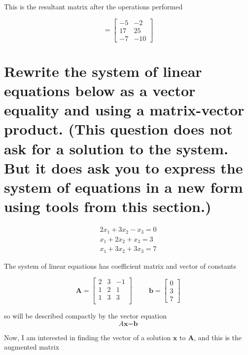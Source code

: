 \documentclass{article}
\begin{document}
This is the resultant matrix after the operations performed

\begin{equation}
  =
  \begin{bmatrix}
    -5 & -2 \\
    17 & 25 \\
    -7 & -10
  \end{bmatrix}
\end{equation}

\bigskip

\section{Rewrite the system of linear equations below as a vector equality and using a matrix-vector product. (This question does not ask for a solution to the system. But it does ask you to express the system of equations in a new form using tools from this section.)}

\[
\begin{matrix}
  2x_1 + 3x_2 - x_3 = 0 \\
  x_1 + 2x_2 + x_3 = 3 \\
  x_1 + 3x_2 + 3x_3 = 7
\end{matrix}
\]

\sol

The system of linear equations has coefficient matrix and vector of constants

\begin{equation}
  \textbf{A}=
  \begin{bmatrix}
    2 & 3& -1 \\
    1 & 2 & 1 \\
    1 & 3 & 3 \\
  \end{bmatrix}
  \hspace{1cm}
  \textbf{b}=
  \begin{bmatrix}
    0 \\
    3 \\
    7
  \end{bmatrix}
\end{equation}

so will be described compactly by the vector equation
\begin{equation}
  \textit{A}\textbf{x} = \textbf{b}
\end{equation}

Now, I am interested in finding the vector of a solution \(\mathbf{x}\) to \(\mathbf{A}\), and this is the augmented matrix
\end{document}
